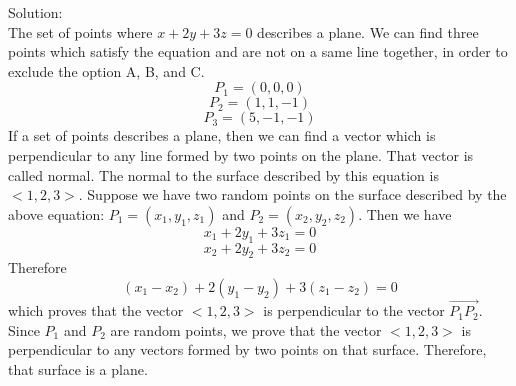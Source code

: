 \documentclass{article}
\begin{document}
Solution:\\
The set of points where $x + 2y + 3z = 0$ describes a plane. We can find three
points which satisfy the equation and are not on a same line together, in order
to exclude the option A, B, and C.
\[ P_1 = (0, 0, 0) \]
\[ P_2 = (1, 1, -1) \]
\[ P_3 = (5, -1, -1) \]
If a set of points describes a plane, then we can find a vector which is
perpendicular to any line formed by two points on the plane. That vector is
called normal. The normal to the surface described by this equation is
$<1, 2, 3>$. Suppose we have two random points on the surface described by the
above equation: $P_{1} = (x_{1}, y_{1}, z_{1})$ and $P_{2} = (x_{2}, y_{2},
z_{2})$. Then we have
\[ x_{1} + 2y_{1} + 3z_{1} = 0 \]
\[ x_{2} + 2y_{2} + 3z_{2} = 0 \]
Therefore
\[ (x_{1} - x_{2}) + 2(y_{1} - y_{2}) + 3(z_{1} - z_{2}) = 0 \]
which proves that the vector $<1, 2, 3>$ is perpendicular to the vector
$\vec{P_{1}P_{2}}$. Since $P_{1}$ and $P_{2}$ are random points, we prove that
the vector $<1, 2, 3>$ is perpendicular to any vectors formed by two points on
that surface. Therefore, that surface is a plane.
\end{document}
